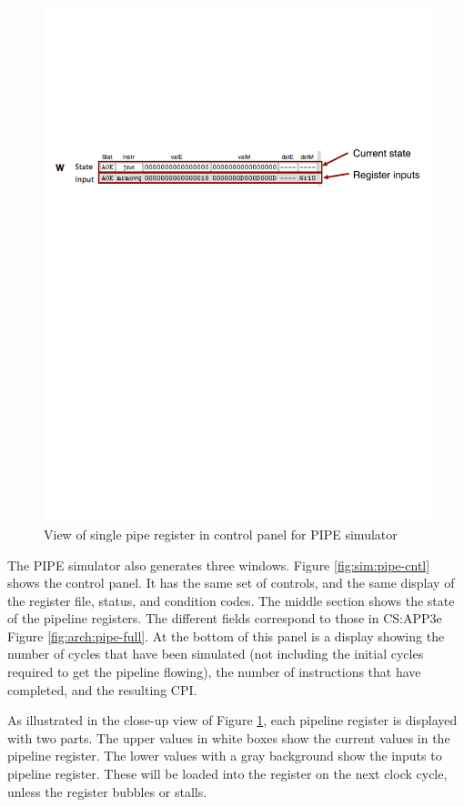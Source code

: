 \documentclass[11pt]{article}
\begin{document}
\begin{figure}
\centerline{\includegraphics*[scale=1.0]{pipe-register}}
\caption{View of single pipe register in control panel for PIPE
simulator}
\label{fig:sim:pipe-register}
\end{figure}

The PIPE simulator also generates three windows.  Figure
\ref{fig:sim:pipe-cntl} shows the control panel.  It has the same set
of controls, and the same display of the register file, status, and condition
codes.  The middle section shows the state of the pipeline registers.
The different fields correspond to those in CS:APP3e Figure
\ref{fig:arch:pipe-full}. At the bottom of this panel is a display
showing the number of cycles that have been simulated (not
including the initial cycles required to get the pipeline flowing),
the number of instructions that have completed, and the resulting
CPI\@.

As illustrated in the close-up view of Figure
\ref{fig:sim:pipe-register}, each pipeline register is displayed with
two parts.  The upper values in white boxes show the current values in
the pipeline register.  The lower values with a gray background show
the inputs to pipeline register.  These will be loaded into the
register on the next clock cycle, unless the register bubbles or
stalls.
\end{document}
